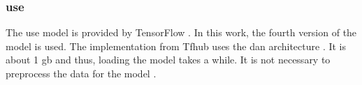 \subsubsection*{\ac{use}}\label{subsubsec:impl-use}

The \ac{use} model is provided by TensorFlow \cite{HfsentTrans2019}.
In this work, the fourth version of the model is used.
The implementation from Tfhub uses the \ac{dan} architecture \cite{UniversalSentEnc-dev}.
It is about 1 \ac{gb} and thus, loading the model takes a while.
It is not necessary to preprocess the data for the model \cite{UniversalSentEnc-dev}.
